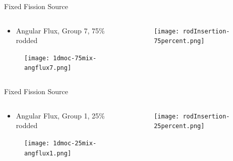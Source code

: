 
\begin{frame}[t]{Fixed Fission Source}

\begin{columns}
    \begin{column}{0.6\textwidth}
        \begin{itemize}
            \item Angular Flux, Group 7, 75\% rodded
        \end{itemize}
        \begin{figure}[H]
            \centering
            \texttt{[image: 1dmoc-75mix-angflux7.png]}
        \end{figure}
    \end{column}
    \begin{column}{0.4\textwidth}
        \begin{figure}[H]
            \centering
            \texttt{[image: rodInsertion-75percent.png]}
        \end{figure}
    \end{column}
\end{columns}

\end{frame}


\begin{frame}[t]{Fixed Fission Source}

\begin{columns}
    \begin{column}{0.6\textwidth}
        \begin{itemize}
            \item Angular Flux, Group 1, 25\% rodded
        \end{itemize}
        \begin{figure}[H]
            \centering
            \texttt{[image: 1dmoc-25mix-angflux1.png]}
        \end{figure}
    \end{column}
    \begin{column}{0.4\textwidth}
        \begin{figure}[H]
            \centering
            \texttt{[image: rodInsertion-25percent.png]}
        \end{figure}
    \end{column}
\end{columns}

\end{frame}

